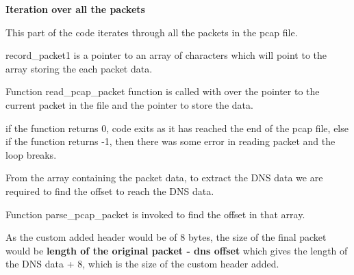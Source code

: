 \documentclass[12pt, a4paper]{report}
\begin{document}
\textbf{Iteration over all the packets}

This part of the code iterates through all the packets in the pcap file. 

record\_packet1 is a pointer to an array of characters which will point to the array storing the each packet data.

Function read\_pcap\_packet function is called with over the pointer to the current packet in the file and the pointer to store the data.

if the function returns 0, code exits as it has reached the end of the pcap file, else if the function returns -1, then there was some error in reading packet and the loop breaks.

From the array containing the packet data, to extract the DNS data we are required to find the offset to reach the DNS data. 

Function parse\_pcap\_packet is invoked to find the offset in that array.

As the custom added header would be of 8 bytes, the size of the final packet would be \textbf{length of the original packet - dns offset} which gives the length of the DNS data + 8, which is the size of the custom header added.

\vspace{3em} 
\end{document}
